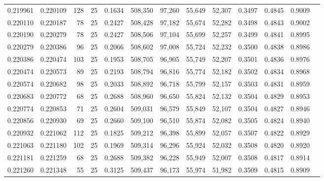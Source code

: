 \begin{tabular}{rrrrrrrrrrrrr}
0.219961 & 0.220109 &   128 &  25 &                                     0.1634 & 508,350 &  97,260 &  55,649 &  52,307 & 0.3497 & 0.4845 & 0.9009 \\
0.220110 & 0.220187 &    78 &  25 &                                     0.2427 & 508,428 &  97,182 &  55,674 &  52,282 & 0.3498 & 0.4843 & 0.9002 \\
0.220190 & 0.220279 &    78 &  25 &                                     0.2427 & 508,506 &  97,104 &  55,699 &  52,257 & 0.3499 & 0.4841 & 0.8995 \\
0.220279 & 0.220386 &    96 &  25 &                                     0.2066 & 508,602 &  97,008 &  55,724 &  52,232 & 0.3500 & 0.4838 & 0.8986 \\
0.220386 & 0.220474 &   103 &  25 &                                     0.1953 & 508,705 &  96,905 &  55,749 &  52,207 & 0.3501 & 0.4836 & 0.8976 \\
0.220474 & 0.220573 &    89 &  25 &                                     0.2193 & 508,794 &  96,816 &  55,774 &  52,182 & 0.3502 & 0.4834 & 0.8968 \\
0.220574 & 0.220682 &    98 &  25 &                                     0.2033 & 508,892 &  96,718 &  55,799 &  52,157 & 0.3503 & 0.4831 & 0.8959 \\
0.220683 & 0.220772 &    68 &  25 &                                     0.2688 & 508,960 &  96,650 &  55,824 &  52,132 & 0.3504 & 0.4829 & 0.8953 \\
0.220774 & 0.220853 &    71 &  25 &                                     0.2604 & 509,031 &  96,579 &  55,849 &  52,107 & 0.3504 & 0.4827 & 0.8946 \\
0.220856 & 0.220930 &    69 &  25 &                                     0.2660 & 509,100 &  96,510 &  55,874 &  52,082 & 0.3505 & 0.4824 & 0.8940 \\
0.220932 & 0.221062 &   112 &  25 &                                     0.1825 & 509,212 &  96,398 &  55,899 &  52,057 & 0.3507 & 0.4822 & 0.8929 \\
0.221063 & 0.221180 &   102 &  25 &                                     0.1969 & 509,314 &  96,296 &  55,924 &  52,032 & 0.3508 & 0.4820 & 0.8920 \\
0.221181 & 0.221259 &    68 &  25 &                                     0.2688 & 509,382 &  96,228 &  55,949 &  52,007 & 0.3508 & 0.4817 & 0.8914 \\
0.221260 & 0.221348 &    55 &  25 &                                     0.3125 & 509,437 &  96,173 &  55,974 &  51,982 & 0.3509 & 0.4815 & 0.8909 \\

\end{tabular}
